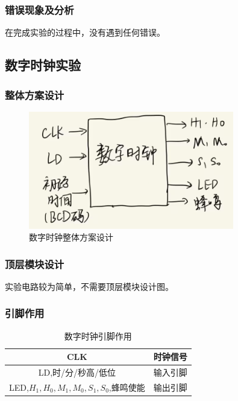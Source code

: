 \documentclass{article}
\begin{document}
    \subsubsection{错误现象及分析}
    在完成实验的过程中，没有遇到任何错误。

    \subsection{数字时钟实验}
    \subsubsection{整体方案设计}
    \begin{figure}[H]
    \centering
    \includegraphics[width=0.8\textwidth]{2.1.png}
    \caption{数字时钟整体方案设计}
    \end{figure}

    \subsubsection{顶层模块设计}
    实验电路较为简单，不需要顶层模块设计图。

    \subsubsection{引脚作用}
    \begin{table}[H]
    \centering
    \begin{tabular}{|c|c|}
        \hline
        CLK & 时钟信号 \\ \hline
        LD,时/分/秒高/低位 & 输入引脚 \\ \hline
        LED,$H_{1},H_{0},M_{1},M_{0},S_{1},S_{0}$,蜂鸣使能  & 输出引脚 \\ \hline
    \end{tabular}
    \caption{数字时钟引脚作用}
    \end{table}
    
\end{document}
